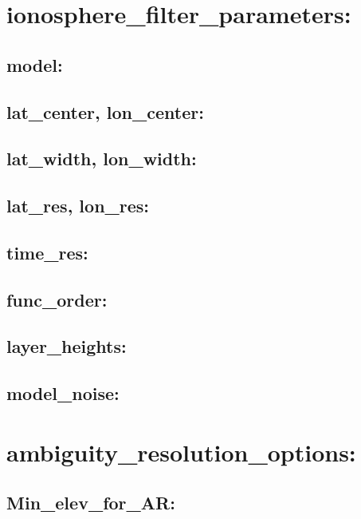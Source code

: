 \section{ionosphere\_filter\_parameters:}

\subsection{model:}

\subsection{lat\_center, lon\_center:}

\subsection{lat\_width, lon\_width:}

\subsection{lat\_res, lon\_res:}

\subsection{time\_res:}

\subsection{func\_order:}

\subsection{layer\_heights:}

\subsection{model\_noise:}





\section{ambiguity\_resolution\_options:}

\subsection{Min\_elev\_for\_AR:}

